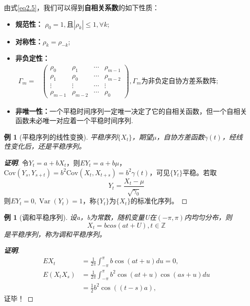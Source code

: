 \documentclass[12pt, a4paper, oneside]{ctexbook}
\newtheorem{example}[theorem]{例}
\newcommand\zm[2]{\begin{proof}[\textbf{#1}]
    #2
\end{proof}}
\newcommand\mb[1]{\mathbb{#1}}
\begin{document}
由式\ref{eq2.5}，我们可以得到\textbf{自相关系数}的如下性质：
\begin{itemize}
    \item \textbf{规范性：} $\rho_0=1,\text{且}|\rho_k|\leq1,\forall k$;
    \item \textbf{对称性：}$\rho_k=\rho_{-k}$;
    \item \textbf{非负定性：}$\begin{aligned}
                  \Gamma_m= & \begin{pmatrix}
                                  \rho_0     & \rho_1     & \cdots & \rho_{m-1} \\
                                  \rho_1     & \rho_0     & \cdots & \rho_{m-2} \\
                                  \vdots     & \vdots     & \cdots & \vdots     \\
                                  \rho_{m-1} & \rho_{m-2} & \cdots & \rho_0
                              \end{pmatrix},\Gamma_m\text{为非负定自协方差系数阵};
              \end{aligned}$
    \item \textbf{非唯一性：}一个平稳时间序列一定唯一决定了它的自相关函数，但一个自相关函数未必唯一对应着一个平稳时间序列.
\end{itemize}

\begin{example}[平稳序列的线性变换]
    平稳序列$\{X_t\}$，期望$\mu$，自协方差函数$\gamma(t)$，经线性变化后，还是平稳序列。
\end{example}
\zm{证明}{令$Y_t=a+bX_t$，则$EY_t=a+b\mu$，$\mathrm{Cov}(Y_s,Y_{s+t})=b^2\mathrm{Cov}(X_t,X_{t+s})=
        b^2\gamma(t)$，可见$\{Y_t\}$平稳。若取
    \begin{equation*}
        Y_t=\frac{X_t-\mu}{\sqrt{\gamma_0}}
    \end{equation*}
    则$EY_t=0,\operatorname{Var}(Y_t)=1$，称$\{Y_t\}$为$\{X_t\}$的标准化序列。
}

\begin{example}[调和平稳序列]\label{ex2.1.7}
    设a，b为常数，随机变量U在$(-\pi,\pi)$内均匀分布，则
    \begin{equation*}
        X_t=bcos(at+U),t \in \mb{Z}
    \end{equation*}
    是平稳序列，称为调和平稳序列。
\end{example}
\zm{证明}{
    \begin{equation*}
        \begin{aligned}
            EX_{t}        & =\frac{1}{2\pi}\int_{-\pi}^{\pi}b\cos(at+u)du=0,            \\
            E(X_{t}X_{s}) & =\frac{1}{2\pi}\int_{-\pi}^{\pi}b^{2}\cos(at+u)\cos(as+u)du \\
                          & =\frac12b^2\cos((t-s)a),
        \end{aligned}
    \end{equation*}
    证毕！
}
\end{document}
